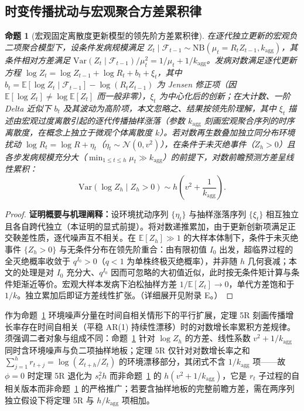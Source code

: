 \documentclass[10pt,a4paper]{article}
\theoremstyle{plain}
\newtheorem{proposition}{命题}
\theoremstyle{definition}
\begin{document}


\subsection{时变传播扰动与宏观聚合方差累积律}

\begin{proposition}[宏观固定离散度更新模型的领先阶方差累积律]\label{thm:t5}
在逐代独立更新的宏观负二项聚合模型下，设条件发病规模满足 $Z_t \mid \mathcal{F}_{t-1} \sim \text{NB}(\mu_t = R_t Z_{t-1}, k_{\text{agg}})$，其条件相对方差满足 $\text{Var}(Z_t \mid \mathcal{F}_{t-1})/\mu_t^2 = 1/\mu_t + 1/k_{\text{agg}}$。发病对数满足逐代更新方程 $\log Z_t = \log Z_{t-1} + \log R_t + b_t + \xi_t$，其中 $b_t = \mathbb{E}[\log Z_t \mid \mathcal{F}_{t-1}] - \log(R_t Z_{t-1})$ 为 Jensen 修正项（因 $\mathbb{E}[\log Z_t] \neq \log \mathbb{E}[Z_t]$ 而一般非零），$\xi_t$ 为中心化后的创新；在大计数、一阶 Delta 近似下 $b_t$ 及其波动为高阶项，本文忽略之、结果按领先阶理解，其中 $\xi_t$ 描述由宏观过度离散引起的逐代传播抽样涨落（参数 $k_{\text{agg}}$ 刻画宏观聚合序列的时序离散度，在概念上独立于微观个体离散度 $k$）。若对数再生数叠加独立同分布环境扰动 $\log R_t = \log R + \eta_t$（$\eta_t \sim \mathcal{N}(0, v^2)$），在条件于未灭绝事件（$Z_h > 0$）且各步发病规模充分大（$\min_{1 \le t \le h} \mu_t \gg k_{\text{agg}}$）的前提下，对数前瞻预测方差呈线性累积：
\begin{equation}
\text{Var}(\log Z_h \mid Z_h > 0) \sim h \left(v^2 + \frac{1}{k_{\text{agg}}}\right).
\end{equation}
\end{proposition}

\begin{proof}
\textbf{证明概要与机理阐释：}设环境扰动序列 $\{\eta_t\}$ 与抽样涨落序列 $\{\xi_t\}$ 相互独立且各自跨代独立（本证明的显式前提）。将对数递推累加，由于更新创新项满足正交鞅差性质，逐代噪声互不相关。在 $\mathbb{E}[Z_h]\gg 1$ 的大样本体制下，条件于未灭绝事件 $\{Z_h>0\}$ 与无条件分布在领先阶重合：由有限初值 $I_0$ 出发，超临界过程的全灭绝概率收敛于 $q^{I_0}>0$（$q<1$ 为单株终极灭绝概率），并非随 $h$ 几何衰减；本文的处理是对 $I_0$ 充分大、$q^{I_0}$ 因而可忽略的大初值近似，此时按无条件矩计算与条件矩渐近等价。宏观大样本发病下泊松抽样方差 $1/\mathbb{E}[Z_t] \to 0$，单代方差饱和于 $1/k$。独立累加后即证方差线性扩张。（详细展开见附录 E。）
\end{proof}

作为命题~\ref{thm:t5} 环境噪声分量在时间自相关情形下的平行扩展，定理 5R 刻画传播增长率存在时间自相关（平稳 AR(1) 持续性漂移）时的对数增长率累积方差规律。须强调二者对象与组成不同：命题~\ref{thm:t5} 针对 $\log Z_h$ 的方差、线性系数 $v^2 + 1/k_{\text{agg}}$ 同时含环境噪声与负二项抽样地板；定理 5R 仅针对对数增长率之和 $\sum_{j=1}^h r_{t+j} = \log(Z_{t+h}/Z_t)$ 的环境漂移部分，其闭式不含 $1/k_{\text{agg}}$ 项——故 $\phi=0$ 时定理 5R 退化为 $s_e^2 h$ 而非命题~\ref{thm:t5} 的 $h(v^2+1/k_{\text{agg}})$，它是 $r_t$ 子过程的自相关版本而非命题~\ref{thm:t5} 的严格推广；若要含抽样地板的完整前瞻方差，需在两序列独立假设下将定理 5R 与 $h/k_{\text{agg}}$ 项相加。
\end{document}
